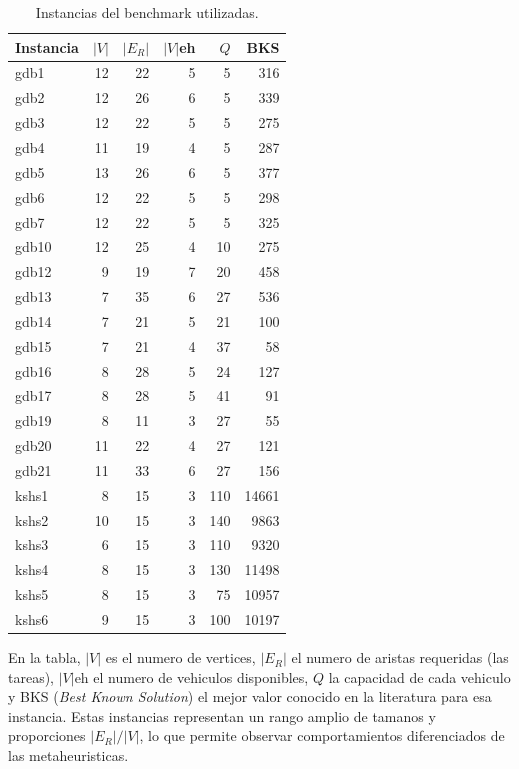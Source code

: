 \begin{table}[h]
\centering
\caption{Instancias del benchmark utilizadas.}
\label{tab:instancias}
\small
\begin{tabular}{lrrrrr}
\toprule
Instancia & $|V|$ & $|E_R|$ & $|V|$eh & $Q$ & BKS \\
\midrule
gdb1  & 12 & 22 & 5 &   5 &  316 \\
gdb2  & 12 & 26 & 6 &   5 &  339 \\
gdb3  & 12 & 22 & 5 &   5 &  275 \\
gdb4  & 11 & 19 & 4 &   5 &  287 \\
gdb5  & 13 & 26 & 6 &   5 &  377 \\
gdb6  & 12 & 22 & 5 &   5 &  298 \\
gdb7  & 12 & 22 & 5 &   5 &  325 \\
gdb10 & 12 & 25 & 4 &  10 &  275 \\
gdb12 & 9  & 19 & 7 &  20 &  458 \\
gdb13 & 7  & 35 & 6 &  27 &  536 \\
gdb14 & 7  & 21 & 5 &  21 &  100 \\
gdb15 & 7  & 21 & 4 &  37 &   58 \\
gdb16 & 8  & 28 & 5 &  24 &  127 \\
gdb17 & 8  & 28 & 5 &  41 &   91 \\
gdb19 & 8  & 11 & 3 &  27 &   55 \\
gdb20 & 11 & 22 & 4 &  27 &  121 \\
gdb21 & 11 & 33 & 6 &  27 &  156 \\
kshs1 & 8  & 15 & 3 & 110 & 14661 \\
kshs2 & 10 & 15 & 3 & 140 &  9863 \\
kshs3 & 6  & 15 & 3 & 110 &  9320 \\
kshs4 & 8  & 15 & 3 & 130 & 11498 \\
kshs5 & 8  & 15 & 3 &  75 & 10957 \\
kshs6 & 9  & 15 & 3 & 100 & 10197 \\
\bottomrule
\end{tabular}
\end{table}

En la tabla, $|V|$ es el numero de vertices, $|E_R|$ el numero de aristas
requeridas (las tareas), $|V|$eh el numero de vehiculos disponibles, $Q$
la capacidad de cada vehiculo y BKS (\emph{Best Known Solution}) el
mejor valor conocido en la literatura para esa instancia. Estas
instancias representan un rango amplio de tamanos y proporciones
$|E_R|/|V|$, lo que permite observar comportamientos diferenciados de
las metaheuristicas.

